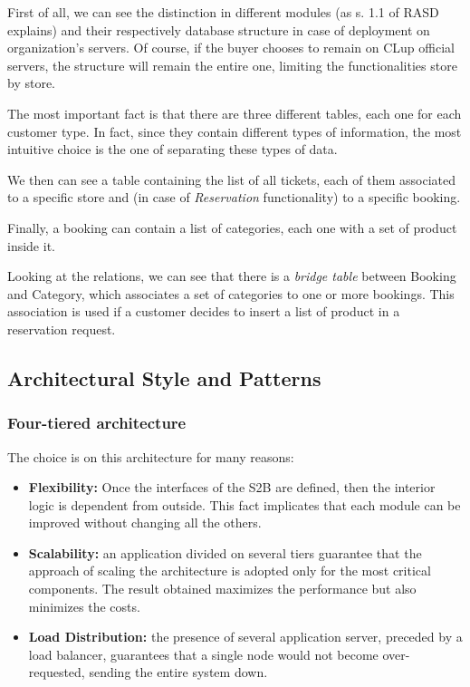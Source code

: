 \documentclass[table, 12pt]{article}
\begin{document}
First of all, we can see the distinction in different modules (as s. 1.1 of RASD explains) and their respectively database structure in case of deployment on organization's servers. Of course, if the buyer chooses to remain on CLup official servers, the structure will remain the entire one, limiting the functionalities store by store.

The most important fact is that there are three different tables, each one for each customer type. In fact, since they contain different types of information, the most intuitive choice is the one of separating these types of data.

We then can see a table containing the list of all tickets, each of them associated to a specific store and (in case of \textit{Reservation} functionality) to a specific booking.

Finally, a booking can contain a list of categories, each one with a set of product inside it.

Looking at the relations, we can see that there is a \textit{bridge table} between Booking and Category, which associates a set of categories to one or more bookings. This association is used if a customer decides to insert a list of product in a reservation request.

\subsection{Architectural Style and Patterns}
\subsubsection{Four-tiered architecture}
The choice is on this architecture for many reasons:
\begin{itemize}
    \item \textbf{Flexibility:} Once the interfaces of the S2B are defined, then the interior logic is dependent from outside. This fact implicates that each module can be improved without changing all the others.
    \item \textbf{Scalability:} an application divided on several tiers guarantee that the approach of scaling the architecture is adopted only for the most critical components. The result obtained maximizes the performance but also minimizes the costs.
    \item \textbf{Load Distribution:} the presence of several application server, preceded by a load balancer, guarantees that a single node would not become over-requested, sending the entire system down.
\end{itemize}
\end{document}
